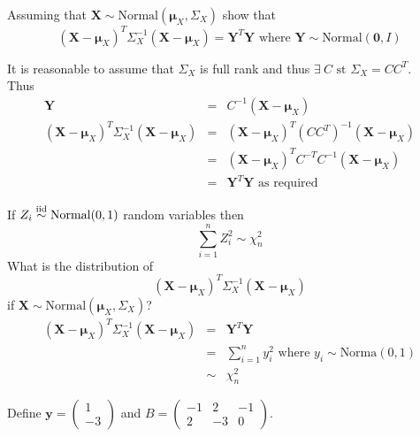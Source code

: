 \documentclass[11pt,a4paper]{article}
\begin{document}
\qpart
Assuming that $\textbf{X}\sim\text{Normal}(\pmb\mu_X,\Sigma_X)$ show that
$$(\textbf{X}-\pmb\mu_X)^T\Sigma_X^{-1}(\textbf{X}-\pmb\mu_X)=\textbf{Y}^T\textbf{Y}\text{ where }\textbf{Y}\sim\text{Normal}(\textbf{0},I)$$

\apart
It is reasonable to assume that $\Sigma_X$ is full rank and thus $\exists\ C\text{ st }\Sigma_X=CC^T$.\\
Thus
\[\begin{array}{rcl}
\textbf{Y}&=&C^{-1}(\textbf{X}-\pmb\mu_X)\\
(\textbf{X}-\pmb\mu_X)^T\Sigma_X^{-1}(\textbf{X}-\pmb\mu_X)&=&(\textbf{X}-\pmb\mu_X)^T(CC^T)^{-1}(\textbf{X}-\pmb\mu_X)\\
&=&(\textbf{X}-\pmb\mu_X)^TC^{-T}C^{-1}(\textbf{X}-\pmb\mu_X)\\
&=&\textbf{Y}^T\textbf{Y}\text{ as required}
\end{array}\]

\qpart
If $Z_i\overset{\text{iid}}{\sim}\text{Normal}(0,1)$ random variables then
$$\sum_{i=1}^nZ_i^2\sim\chi^2_n$$
What is the distribution of
$$(\textbf{X}-\pmb\mu_X)^T\Sigma_X^{-1}(\textbf{X}-\pmb\mu_X)$$
if $\textbf{X}\sim\text{Normal}(\pmb\mu_X,\Sigma_X)$?\\

\apartnb
\[\begin{array}{rcl}
(\textbf{X}-\pmb\mu_X)^T\Sigma_X^{-1}(\textbf{X}-\pmb\mu_X)&=&\textbf{Y}^T\textbf{Y}\\
&=&\displaystyle\sum_{i=1}^ny_i^2\text{ where }y_i\sim\text{Norma}(0,1)\\
&\sim&\chi^2_n
\end{array}\]

\question

\qpart
Define $\textbf{y}=\begin{pmatrix}1\\-3\end{pmatrix}$ and $B=\begin{pmatrix}-1&2&-1\\2&-3&0\end{pmatrix}$.\\
\end{document}
